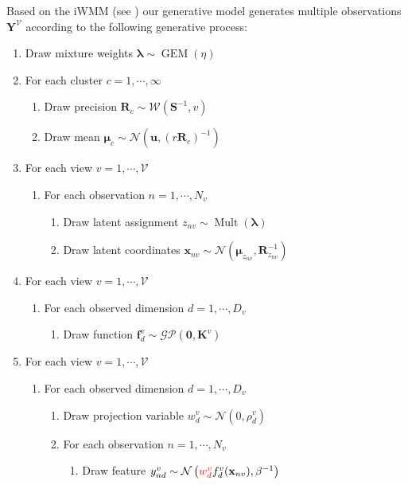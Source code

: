 \documentclass[]{article}
\newcommand{\gD}[2]{\mathcal{N}\left(#1,#2\right)}
\begin{document}
Based on the iWMM (see \cite{IwaDuvGha2012warped}) our generative model generates multiple observations $\mathbf{Y}^{\mathcal{V}}$ according to the following generative process:

\begin{enumerate}
	\item Draw mixture weights $\boldsymbol{\lambda}\sim \operatorname{GEM}(\eta)$
	\item For each cluster $c = 1, \cdots,\infty $
	\begin{enumerate}
		\item Draw precision $\mathbf{R}_c \sim \mathcal{W}(\mathbf{S}^{-1},v)$
		\item Draw mean $\boldsymbol{\mu}_c \sim \mathcal{N}(\mathbf{u},(r\mathbf{R}_c)^{-1})$
	\end{enumerate}
	
	\item For each view $v = 1, \cdots,\mathcal{V} $
	\begin{enumerate}
		\item For each observation $n = 1,\cdots,N_v$
	\begin{enumerate}
		\item Draw latent assignment $z_{nv} \sim \operatorname{Mult}(\boldsymbol{\lambda})$
		\item Draw latent coordinates $\mathbf{x}_{nv} \sim \mathcal{N}(\boldsymbol{\mu}_{z_{nv}},\mathbf{R}_{z_{nv}}^{-1})$
	\end{enumerate}
	\end{enumerate}

	\item For each view $v = 1, \cdots,\mathcal{V} $
	\begin{enumerate}
		\item For each observed dimension $d = 1,\cdots,D_v$
		\begin{enumerate}
			\item Draw function $\mathbf{f}_{d}^{v} \sim \mathcal{GP}(\mathbf{0},\mathbf{K}^{v})$
		\end{enumerate}
	\end{enumerate}

	\item For each view $v = 1, \cdots,\mathcal{V} $
			
			
	\begin{enumerate}
		
		\item For each observed dimension $d = 1,\cdots,D_v$

		\begin{enumerate}
					\item Draw projection variable ${w}_{d}^v\sim \gD{0}{\rho_d^v}$
			\item For each observation $n = 1,\cdots,N_v$
			\begin{enumerate}
				\item Draw feature $y_{nd}^{v}\sim \gD{\textcolor{red}{{w}_{d}^v}f_d^{v}(\mathbf{x}_{nv})}{\beta^{-1}}$
			\end{enumerate}
		\end{enumerate}
	\end{enumerate}
\end{enumerate}
\end{document}
